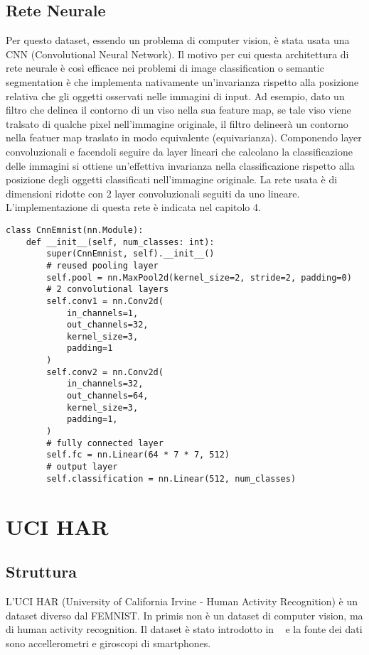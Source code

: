 \subsection{Rete Neurale}
Per questo dataset, essendo un problema di computer vision, è stata
usata una CNN (Convolutional Neural Network). Il motivo per cui questa 
architettura di rete neurale è così efficace nei problemi di image 
classification o semantic segmentation è che implementa nativamente 
un'invarianza rispetto alla posizione relativa che gli oggetti 
osservati nelle immagini 
di input. Ad esempio, dato un filtro che delinea il contorno di un 
viso nella sua feature map, se tale viso viene tralsato di qualche 
pixel nell'immagine originale, il filtro delineerà un contorno nella 
featuer map traslato in modo equivalente (equivarianza). Componendo 
layer convoluzionali e facendoli seguire da layer lineari che calcolano 
la classificazione delle immagini si ottiene un'effettiva invarianza 
nella classificazione rispetto alla posizione degli oggetti classificati 
nell'immagine originale. La rete usata è di dimensioni ridotte con 2 
layer convoluzionali seguiti da uno lineare. L'implementazione di questa 
rete è indicata nel capitolo 4.
\begin{lstlisting}
class CnnEmnist(nn.Module):
    def __init__(self, num_classes: int):
        super(CnnEmnist, self).__init__()
        # reused pooling layer
        self.pool = nn.MaxPool2d(kernel_size=2, stride=2, padding=0)
        # 2 convolutional layers
        self.conv1 = nn.Conv2d(
            in_channels=1,
            out_channels=32,
            kernel_size=3,
            padding=1
        )
        self.conv2 = nn.Conv2d(
            in_channels=32,
            out_channels=64,
            kernel_size=3,
            padding=1,
        )
        # fully connected layer
        self.fc = nn.Linear(64 * 7 * 7, 512)
        # output layer
        self.classification = nn.Linear(512, num_classes)
\end{lstlisting}


\section{UCI HAR}
\subsection{Struttura}
L'UCI HAR (University of California Irvine -
Human Activity Recognition) è un dataset diverso dal FEMNIST. In primis
non è un dataset di computer vision, ma di human activity recognition.
Il dataset è stato introdotto in ~\cite{Anguita2013APD} e la fonte dei
dati sono accellerometri e giroscopi di smartphones.

